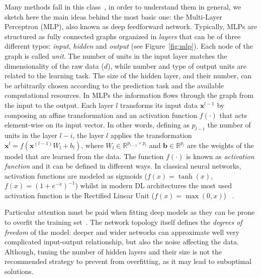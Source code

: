     Many methods fall in this class~\cite{lecun2015deep}, in order to understand them in general, we sketch here the main ideas behind the most basic one: the Multi-Layer Perceptron (MLP), also known as deep feedforward network.
    Typically, MLPs are structured as fully connected graphs organized in \textit{layers} that can be of three different types: \textit{input},  \textit{hidden} and \textit{output} (see Figure~\ref{fig:mlp}). Each node of the graph is called \textit{unit}. The number of units in the input layer matches the dimensionality of the raw data ($d$), while number and type of output units are related to the learning task. The size of the hidden layer, and their number, can be arbitrarily chosen according to the prediction task and the available computational resources.
    In MLPs the information flows through the graph from the input to the output. Each layer $l$ transforms its input data $\bm{x}^{l-1}$ by composing an affine transformation and an activation function $f(\cdot)$ that acts element-wise on its input vector. In other words, defining as $p_{l-i}$ the number of units in the layer $l-i$, the layer $l$ applies the transformation $\bm{x}^{l} = f(\bm{x}^{(l-1)}W_l+b_l)$, where $W_l \in \mathbb{R}^{p_{l-1} \times p_l}$ and $\bm{b} \in \mathbb{R}^{p_l}$ are the weights of the model that are learned from the data. The function $f(\cdot)$ is known as \textit{activation function} and it can be defined in different ways. In classical neural networks, activation functions are modeled as sigmoids (\eg $f(x)=\tanh(x)$, $f(x)=(1+e^{-x})^{-1}$) whilst in modern DL architectures the most used activation function is the Rectified Linear Unit (\ie $f(x)=\max(0,x)$)~\cite{lecun2015deep} .

    

    Particular attention must be paid when fitting deep models as they can be prone to overfit the training set~\cite{angermueller2016deep}.
    The network topology itself defines the \textit{degrees of freedom} of the model: deeper and wider networks can approximate well very complicated input-output relationship, but also the noise affecting the data.
    Although, tuning the number of hidden layers and their size is not the recommended strategy to prevent from overfitting, as it may lead to suboptimal solutions.

